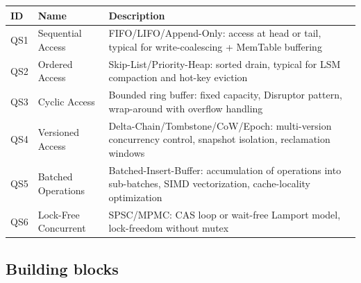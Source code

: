 \begin{scriptsize}
\begin{longtable}{@{}>{\raggedright\arraybackslash}p{1.8cm} >{\raggedright\arraybackslash}p{3.2cm} >{\raggedright\arraybackslash}p{8.5cm}@{}}
\toprule
ID & Name & Description \\
\midrule
\endhead%
QS1 & Sequential Access & FIFO/\allowbreak{}LIFO/\allowbreak{}Append-Only: access at head or tail, typical for write-coalescing + Mem\allowbreak{}Table buffering \\
QS2 & Ordered Access & Skip-List/\allowbreak{}Priority-Heap: sorted drain, typical for LSM compaction and hot-key eviction \\
QS3 & Cyclic Access & Bounded ring buffer: fixed capacity, Disruptor pattern, wrap-around with overflow handling \\
QS4 & Versioned Access & Delta-Chain/\allowbreak{}Tombstone/\allowbreak{}Co\allowbreak{}W/\allowbreak{}Epoch: multi-version concurrency control, snapshot isolation, reclamation windows \\
QS5 & Batched Operations & Batched-Insert-Buffer: accumulation of operations into sub-batches, SIMD vectorization, cache-locality optimization \\
QS6 & Lock-Free Concurrent & SPSC/\allowbreak{}MPMC\@: CAS loop or wait-free Lamport model, lock-freedom without mutex \\
\bottomrule
\end{longtable}
\end{scriptsize}

\subsection*{Building blocks}

